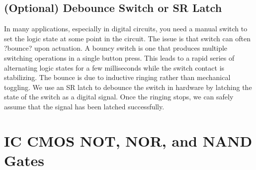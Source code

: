 \documentclass[12pt]{../manual}
\begin{document}
\subsection{(Optional) Debounce Switch or SR Latch}
In many applications, especially in digital circuits, you need a manual switch to
set the logic state at some point in the circuit. The issue is that switch can often
?bounce? upon actuation. A bouncy switch is one that produces multiple
switching operations in a single button press. This leads to a rapid series of
alternating logic states for a few milliseconds while the switch contact is
stabilizing. The bounce is due to inductive ringing rather than mechanical
toggling. We use an SR latch to debounce the switch in hardware by latching
the state of the switch as a digital signal. Once the ringing stops, we can safely
assume that the signal has been latched successfully.

\newpage
\section{IC CMOS NOT, NOR, and NAND Gates}
\end{document}

